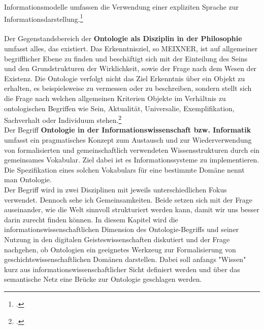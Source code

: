 \documentclass[12pt,a4paper]{article}
\begin{document}
Informationsmodelle umfassen die Verwendung einer expliziten Sprache zur Informationsdarstellung.\footcite{kobler2010qualitat} 
\\
\\
Der Gegenstandsbereich der \textbf{Ontologie als Disziplin in der Philosophie} umfasst alles, das existiert. Das Erkenntnisziel, so MEIXNER, ist auf allgemeiner begrifflicher Ebene zu finden und beschäftigt sich mit der Einteilung des Seins und den Grundstrukturen der Wirklichkeit, sowie der Frage nach dem Wesen der Existenz. Die Ontologie verfolgt nicht das Ziel Erkenntnis über ein Objekt zu erhalten, es beispielsweise zu vermessen oder zu beschreiben, sondern stellt sich die Frage nach welchen allgemeinen Kriterien Objekte im Verhältnis zu ontologischen Begriffen wie Sein, Aktualität, Universalie, Exemplifikation, Sachverhalt oder Individuum stehen.\footcite{meixner1994wissenschaft}
\\
Der Begriff \textbf{Ontologie in der Informationswissenschaft bzw. Informatik} umfasst ein pragmatisches Konzept zum Austausch und zur Wiederverwendung von formalisierten und gemeinschaftlich verwendeten Wissensstrukturen durch ein gemeinsames Vokabular. Ziel dabei ist es Informationssysteme zu implementieren. Die Spezifikation eines solchen Vokabulars für eine bestimmte Domäne nennt man Ontologie.
\\
Der Begriff wird in zwei Disziplinen mit jeweils unterschiedlichen Fokus verwendet. Dennoch sehe ich Gemeinsamkeiten. Beide setzen sich mit der Frage auseinander, wie  die Welt sinnvoll strukturiert werden kann, damit wir uns besser darin zurecht finden können. In diesem Kapitel wird die informationswissenschaftlichen Dimension des Ontologie-Begriffs und seiner Nutzung in den digitalen Geisteswissenschaften diskutiert und der Frage nachgehen, ob Ontologien ein geeignetes Werkzeug zur Formalisierung von geschichtswissenschaftlichen Domänen darstellen. Dabei soll anfangs "Wissen" kurz aus informationswissenschaftlicher Sicht definiert werden und über das semantische Netz eine Brücke zur Ontologie geschlagen werden. 

\end{document}
